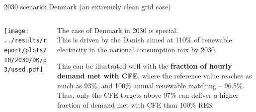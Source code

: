  
\begin{frame}{2030 scenario: Denmark (an extremely clean grid case)}

  {\footnotesize

  \begin{columns}[T]
  \begin{column}{9cm}
  \centering

  \texttt{[image: ../results/report/plots/10/2030/DK/p3/used.pdf]}
  \end{column}
  \begin{column}{6cm}
  
  \vspace{0.5cm}
  The case of Denmark in 2030 is special. \\
  This is driven by the Danish
  aimed at \alert{110\% of renewable electricity} in the national consumption mix by 2030.
      
  \vspace{0.3cm}
  This can be illustrated well with the {\bf fraction of hourly demand met with CFE}, where 
  the reference value reaches as much as \alert{93\%}, and 100\% annual renewable matching -- \alert{96.5\%}.
  Thus, only the \alert{CFE targets above 97\%} can deliver a higher fraction of demand met with CFE than
  100\% RES.

  \end{column}
  \end{columns}
  }
  \end{frame}
  
  
  
